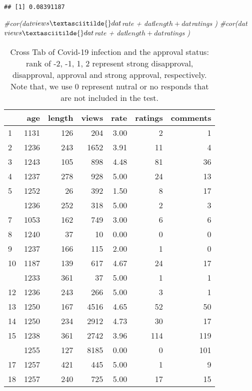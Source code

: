 \documentclass[
]{article}
\newenvironment{Shaded}{\begin{snugshade}}{\end{snugshade}}
\newcommand{\CommentTok}[1]{\textcolor[rgb]{0.56,0.35,0.01}{\textit{#1}}}
\begin{document}
\begin{verbatim}
## [1] 0.08391187
\end{verbatim}

\begin{Shaded}
\begin{Highlighting}[]
\CommentTok{\#cor(dat$views \textasciitilde{} dat$rate + dat$length + dat$ratings  )}
\CommentTok{\#cor(dat$views \textasciitilde{} dat$rate + dat$length + dat$ratings  )}
\end{Highlighting}
\end{Shaded}

\begin{table}

\caption{\label{tab:summary-table}Cross Tab of Covid-19 infection and the approval status:  rank of -2, -1, 1, 2  represent strong disapproval, disapproval, approval and strong approval, respectively. Note that, we use 0 represent nutral or no responds that are not included in the test. }
\centering
\begin{tabular}[t]{lrrrrrr}
\toprule
  & age & length & views & rate & ratings & comments\\
\midrule
1 & 1131 & 126 & 204 & 3.00 & 2 & 1\\
2 & 1236 & 243 & 1652 & 3.91 & 11 & 4\\
3 & 1243 & 105 & 898 & 4.48 & 81 & 36\\
4 & 1237 & 278 & 928 & 5.00 & 24 & 13\\
5 & 1252 & 26 & 392 & 1.50 & 8 & 17\\
\addlinespace
6 & 1236 & 252 & 318 & 5.00 & 2 & 3\\
7 & 1053 & 162 & 749 & 3.00 & 6 & 6\\
8 & 1240 & 37 & 10 & 0.00 & 0 & 0\\
9 & 1237 & 166 & 115 & 2.00 & 1 & 0\\
10 & 1187 & 139 & 617 & 4.67 & 24 & 17\\
\addlinespace
11 & 1233 & 361 & 37 & 5.00 & 1 & 1\\
12 & 1236 & 243 & 266 & 5.00 & 3 & 1\\
13 & 1250 & 167 & 4516 & 4.65 & 52 & 50\\
14 & 1250 & 234 & 2912 & 4.73 & 30 & 17\\
15 & 1238 & 361 & 2742 & 3.96 & 114 & 119\\
\addlinespace
16 & 1255 & 127 & 8185 & 0.00 & 0 & 101\\
17 & 1257 & 421 & 445 & 5.00 & 1 & 9\\
18 & 1257 & 240 & 725 & 5.00 & 17 & 15\\

\end{tabular}
\end{table}
\end{document}
